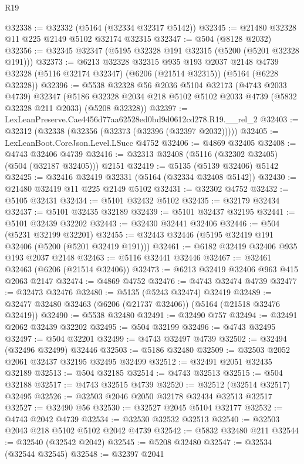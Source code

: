 \begin{lexlean}{R19}
\begin{coremodule}
{{{{{{{{{{{@32338 := @32332 (@5164 (@32334 @32317 @5142))
@32345 := @21480 @32328 @11 @225 @2149 @5102 @32174 @32315
@32347 := @504 (@8128 @2032)
@32356 := @32345 @32347 (@5195 @32328 @191 @32315 (@5200 (@5201 @32328 @191)))
@32373 := @6213
    @32328
    @32315
    @935
    @193
    @2037
    @2148
    @4739
    @32328
    (@5116 @32174 @32347)
    (@6206 (@21514 @32315))
    (@5164 (@6228 @32328))
@32396 := @5538
    @32328
    @56
    @2036
    @5104
    @32173
    (@4743 @2033 @4739)
    @32347
    (@5186 @32328 @2034 @218 @5102 @5102 @2033 @4739 (@5832 @32328 @211 @2033) (@5208 @32328))
@32397 := LexLeanPreserve.Cae4456d77aa62528ed0bd9d0612cd278.R19.__rel_2
@32403 := @32312 (@32338 (@32356 (@32373 (@32396 (@32397 @2032)))))
@32405 := LexLeanBoot.CoreJson.Level.LSucc @4752
@32406 := @4869 @32405
@32408 := @4743 @32406 @4739
@32416 := @32313 @32408 (@5116 (@32302 @32405) (@504 (@32187 @32405))) @2151
@32419 := @5135 (@5139 @32406) @5142
@32425 := @32416 @32419 @32331 (@5164 (@32334 @32408 @5142))
@32430 := @21480 @32419 @11 @225 @2149 @5102
@32431 := @32302 @4752
@32432 := @5105 @32431
@32434 := @5101 @32432 @5102
@32435 := @32179 @32434
@32437 := @5101 @32435 @32189
@32439 := @5101 @32437 @32195
@32441 := @5101 @32439 @32202
@32443 := @32430 @32441 @32406
@32446 := @504 (@5231 @32199 @32201)
@32455 := @32443 @32446 (@5195 @32419 @191 @32406 (@5200 (@5201 @32419 @191)))
@32461 := @6182 @32419 @32406 @935 @193 @2037 @2148
@32463 := @5116 @32441 @32446
@32467 := @32461 @32463 (@6206 (@21514 @32406))
@32473 := @6213 @32419 @32406 @963 @415 @2063 @2147
@32474 := @4869 @4752
@32476 := @4743 @32474 @4739
@32477 := @32473 @32476
@32480 := @5135 (@5243 @32474) @32419
@32489 := @32477 @32480 @32463 (@6206 (@21737 @32406)) (@5164 (@21518 @32476 @32419))
@32490 := @5538 @32480
@32491 := @32490 @757
@32494 := @32491 @2062 @32439 @32202
@32495 := @504 @32199
@32496 := @4743 @32495
@32497 := @504 @32201
@32499 := @4743 @32497 @4739
@32502 := @32494 (@32496 @32499) @32446
@32503 := @5186 @32480
@32509 := @32503 @2052 @2061 @32437 @32195 @32495 @32499
@32512 := @32491 @2051 @32435 @32189
@32513 := @504 @32185
@32514 := @4743 @32513
@32515 := @504 @32188
@32517 := @4743 @32515 @4739
@32520 := @32512 (@32514 @32517) @32495
@32526 := @32503 @2046 @2050 @32178 @32434 @32513 @32517
@32527 := @32490 @56
@32530 := @32527 @2045 @5104 @32177
@32532 := @4743 @2042 @4739
@32534 := @32530 @32532 @32513
@32540 := @32503 @2043 @218 @5102 @5102 @2042 @4739
@32542 := @5832 @32480 @211
@32544 := @32540 (@32542 @2042)
@32545 := @5208 @32480
@32547 := @32534 (@32544 @32545)
@32548 := @32397 @2041
}}}}}}}}}}}
\end{coremodule}
\end{lexlean}
